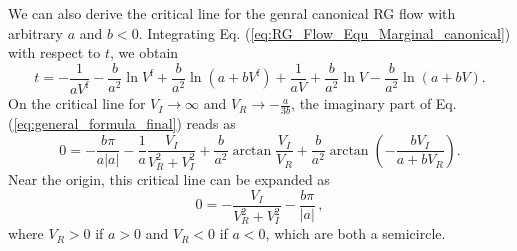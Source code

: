 \documentclass[aps,onecolumn,nofootinbib,superscriptaddress,notitlepage,longbibliography]{revtex4-1}
\begin{document}
We can also derive the critical line for the genral canonical RG flow with arbitrary $a$ and $b<0$. Integrating Eq. (\ref{eq:RG_Flow_Equ_Marginal_canonical}) with respect to $t$, we obtain
\begin{equation}
	t=-\frac{1}{a V^{\mathrm{f}}}-\frac{b}{a^2}\ln{V^\mathrm{f}}+\frac{b}{a^2}\ln{(a+b V^\mathrm{f})}+\frac{1}{a V}+\frac{b}{a^2}\ln{V}-\frac{b}{a^2}\ln{(a+b V)}.
\label{eq:general_formula_final}
\end{equation}
On the critical line for $V_I\to\infty$ and $V_R\to-\frac{a}{3b}$, the imaginary part of Eq. (\ref{eq:general_formula_final}) reads as 
\begin{equation}
	0=-\frac{b\pi}{a|a|}-\frac{1}{a}\frac{V_I}{V_R^2+V_I^2}+\frac{b}{a^2}\arctan{\frac{V_I}{V_R}}+\frac{b}{a^2}\arctan{(-\frac{b V_I}{a+b V_R})}.
\label{eq:imaginary_part_boundary}
\end{equation}
Near the origin, this critical line can be expanded as 
\begin{equation}
0=-\frac{V_I}{V_R^2+V_I^2}-\frac{b\pi}{|a|}\,,%
\end{equation}
where $V_R>0$ if $a>0$ and $V_R<0$ if $a<0$, which are both a semicircle.


%
\end{document}
